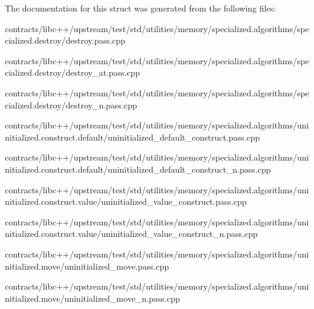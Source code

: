 

The documentation for this struct was generated from the following files\+:\begin{DoxyCompactItemize}
\item 
contracts/libc++/upstream/test/std/utilities/memory/specialized.\+algorithms/specialized.\+destroy/destroy.\+pass.\+cpp\item 
contracts/libc++/upstream/test/std/utilities/memory/specialized.\+algorithms/specialized.\+destroy/destroy\+\_\+at.\+pass.\+cpp\item 
contracts/libc++/upstream/test/std/utilities/memory/specialized.\+algorithms/specialized.\+destroy/destroy\+\_\+n.\+pass.\+cpp\item 
contracts/libc++/upstream/test/std/utilities/memory/specialized.\+algorithms/uninitialized.\+construct.\+default/uninitialized\+\_\+default\+\_\+construct.\+pass.\+cpp\item 
contracts/libc++/upstream/test/std/utilities/memory/specialized.\+algorithms/uninitialized.\+construct.\+default/uninitialized\+\_\+default\+\_\+construct\+\_\+n.\+pass.\+cpp\item 
contracts/libc++/upstream/test/std/utilities/memory/specialized.\+algorithms/uninitialized.\+construct.\+value/uninitialized\+\_\+value\+\_\+construct.\+pass.\+cpp\item 
contracts/libc++/upstream/test/std/utilities/memory/specialized.\+algorithms/uninitialized.\+construct.\+value/uninitialized\+\_\+value\+\_\+construct\+\_\+n.\+pass.\+cpp\item 
contracts/libc++/upstream/test/std/utilities/memory/specialized.\+algorithms/uninitialized.\+move/uninitialized\+\_\+move.\+pass.\+cpp\item 
contracts/libc++/upstream/test/std/utilities/memory/specialized.\+algorithms/uninitialized.\+move/uninitialized\+\_\+move\+\_\+n.\+pass.\+cpp\end{DoxyCompactItemize}
